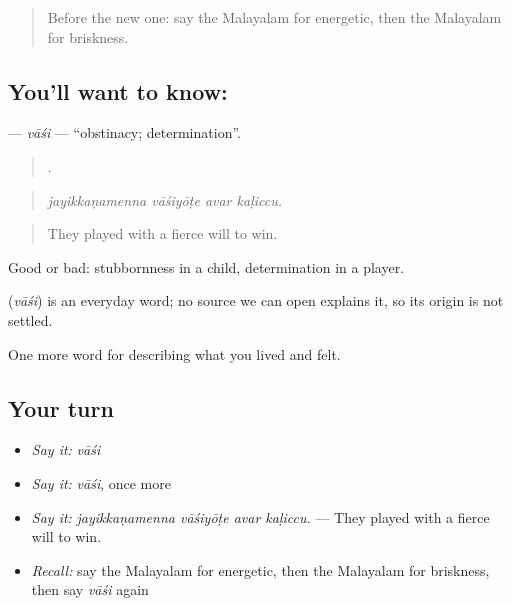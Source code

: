 \label{lesson:ML-C530-vasi}



\begin{quote}
Before the new one: say the Malayalam for energetic, then the Malayalam for briskness.
\end{quote}

\subsection*{You'll want to know: }
\textbf{} — \emph{vāśi} — \textquotedblleft{}obstinacy; determination\textquotedblright{}.

\begin{quote}
   .
\end{quote}

\begin{quote}
\emph{jayikkaṇamenna vāśiyōṭe avar kaḷiccu.}
\end{quote}

\begin{quote}
They played with a fierce will to win.
\end{quote}

Good or bad: stubbornness in a child, determination in a player.

\begin{cousinweb}
\textbf{} (\emph{vāśi}) is an everyday word; no source we can open explains it, so its origin is not settled.
\end{cousinweb}

\begin{grammarlens}[title={What you've built}]
One more word for describing what you lived and felt.
\end{grammarlens}

\subsection*{Your turn}
\begin{itemize}
\raggedright
  \item \emph{Say it:} \emph{vāśi}
  \item \emph{Say it:} \emph{vāśi}, once more
  \item \emph{Say it:} \emph{jayikkaṇamenna vāśiyōṭe avar kaḷiccu.} — They played with a fierce will to win.
  \item \emph{Recall:} say the Malayalam for energetic, then the Malayalam for briskness, then say \emph{vāśi} again
\end{itemize}


